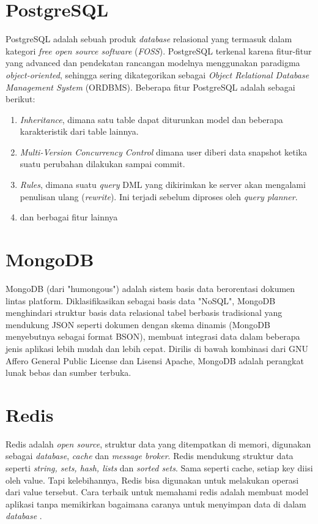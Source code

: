    \section{PostgreSQL}
   PostgreSQL adalah sebuah produk \textit{database} relasional yang termasuk dalam kategori \textit{free open source software} (\textit{FOSS}). 
   PostgreSQL terkenal karena fitur-fitur yang advanced dan pendekatan rancangan modelnya menggunakan paradigma \textit{object-oriented}, sehingga sering dikategorikan sebagai \textit{Object Relational Database Management System} (ORDBMS).
   Beberapa fitur PostgreSQL adalah sebagai berikut:
   \begin{enumerate}
      	\item \textit{Inheritance}, dimana satu table dapat diturunkan model dan beberapa karakteristik dari table lainnya.
      	\item \textit{Multi-Version Concurrency Control} dimana user diberi data snapshot ketika suatu perubahan dilakukan sampai commit.
      	\item \textit{Rules}, dimana suatu \textit{query} DML yang dikirimkan ke server akan mengalami penulisan ulang (\textit{rewrite}). Ini terjadi sebelum diproses oleh \textit{query planner}.
      	\item dan berbagai fitur lainnya \cite{noauthor_postgresql_nodate}
   \end{enumerate}
   
   \section{MongoDB}
   MongoDB (dari "humongous") adalah sistem basis data berorentasi dokumen lintas platform. Diklasifikasikan sebagai basis data "NoSQL", MongoDB menghindari struktur basis data relasional tabel berbasis tradisional yang mendukung JSON seperti dokumen dengan skema dinamis (MongoDB menyebutnya sebagai format BSON), membuat integrasi data dalam beberapa jenis aplikasi lebih mudah dan lebih cepat. Dirilis di bawah kombinasi dari GNU Affero General Public License dan Lisensi Apache, MongoDB adalah perangkat lunak bebas dan sumber terbuka\cite{noauthor_mongodb_2017}.
   
   \section{Redis}
   Redis adalah \textit{open source}, struktur data yang ditempatkan di memori, digunakan sebagai \textit{database}, \textit{cache} dan \textit{message broker}. Redis mendukung struktur data seperti \textit{string, sets, hash, lists} dan \textit{sorted sets}. Sama seperti cache, setiap key diisi oleh value. Tapi kelebihannya, Redis bisa digunakan untuk melakukan operasi dari value tersebut. Cara terbaik untuk memahami redis adalah membuat model aplikasi tanpa memikirkan bagaimana caranya untuk menyimpan data di dalam \textit{database} \cite{yudana_redis_2015}.
   
